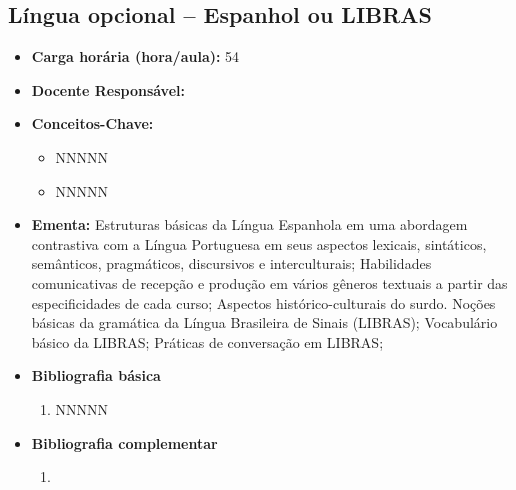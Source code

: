\documentclass[11pt,fleqn]{book} %
\begin{document}
\subsection{Língua opcional – Espanhol ou LIBRAS}\label{disc:espanhol_libras}
\begin{itemize}
	\item \textbf{Carga horária (hora/aula):} 54
	\item \textbf{Docente Responsável:}
	\item \textbf{Conceitos-Chave:}
	\begin{itemize}
		\item NNNNN
		\item NNNNN
	\end{itemize}
	\item \textbf{Ementa:} 
	Estruturas básicas da Língua Espanhola em uma abordagem contrastiva com a Língua Portuguesa em seus aspectos lexicais, sintáticos, semânticos, pragmáticos, discursivos e interculturais; 
	Habilidades comunicativas de recepção e produção em vários gêneros textuais a partir das especificidades de cada curso;
	Aspectos histórico-culturais do surdo. Noções básicas da gramática da Língua Brasileira de Sinais (LIBRAS);
	Vocabulário básico da LIBRAS;
	Práticas de conversação em LIBRAS;		
	\item \textbf{Bibliografia básica}
	\begin{enumerate}
		\item NNNNN
	\end{enumerate}
	\item \textbf{Bibliografia complementar}
	\begin{enumerate}
		\item 
	\end{enumerate}	
\end{itemize}


\newpage
\end{document}
